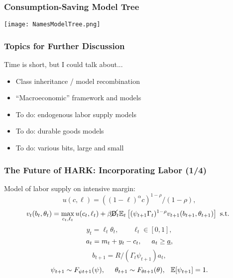 \documentclass[11ptt]{beamer}
\newcommand{\E}{\mathbb{E}}
\newcommand{\Die}{\mathsf{D}}
\newcommand{\Live}{\cancel{\Die}}
\begin{document}
\begin{frame}
\frametitle{Consumption-Saving Model Tree}
\begin{center}
\texttt{[image: NamesModelTree.png]}
\end{center}
\end{frame}



\begin{frame}\label{DiscussionTopics}
\frametitle{Topics for Further Discussion}

Time is short, but I could talk about...
\begin{itemize}
\item Class inheritance / model recombination \hyperlink{Recombination}{}

\item ``Macroeconomic'' framework and models \hyperlink{Macroeconomics}{}

\item To do: endogenous labor supply models  \hyperlink{LaborSupply}{}

\item To do: durable goods models \hyperlink{DurableGoods}{}

\item To do: various bits, large and small \hyperlink{StructuralChanges}{}
\end{itemize}
\end{frame}


\begin{frame}\label{LaborSupply}
\frametitle{The Future of HARK: Incorporating Labor (1/4)}
Model of labor supply on intensive margin:
\begin{equation*}
u(c,\ell) = ((1-\ell)^\alpha c)^{1-\rho}/(1-\rho),
\end{equation*}
\begin{equation*}
v_t(b_t,\theta_t) = \max_{c_t, \ell_t} u(c_t,\ell_t) + \beta \Live_t \E_t \left[(\psi_{t+1} \Gamma_t)^{1-\rho} v_{t+1}(b_{t+1},\theta_{t+1}) \right] \text{ s.t. }
\end{equation*}
\begin{equation*}
y_t = \ell_t \theta_t, \qquad \ell_t \in [0,1],
\end{equation*}
\begin{equation*}
a_t = m_t + y_t - c_t, \hspace{0.5cm} a_t \geq \underline{a},
\end{equation*}
\begin{equation*}
b_{t+1} = R/(\Gamma_t \psi_{t+1}) a_t, 
\end{equation*}
\begin{equation*}
\psi_{t+1} \sim F_{\psi t+1}(\psi), \hspace{0.5cm} \theta_{t+1} \sim F_{\theta t+1}(\theta), \hspace{0.25cm} \E[\psi_{t+1}] = 1.
\end{equation*}
\end{frame}
\end{document}
